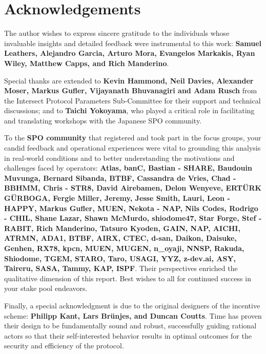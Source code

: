 \documentclass[11pt, letterpaper]{article}
\begin{document}
\tableofcontents
\newpage
\pagestyle{fancy} 

\newpage

\section*{Acknowledgements}

The author wishes to express sincere gratitude to the individuals whose 
invaluable insights and detailed feedback were instrumental to this work: 
\textbf{Samuel Leathers, Alejandro Garcia, Arturo Mora, Evangelos Markakis, Ryan Wiley, 
Matthew Capps, and Rich Manderino}.

Special thanks are extended to \textbf{Kevin Hammond, Neil Davies, Alexander Moser, Markus Gufler, 
Vijayanath Bhuvanagiri and Adam Rusch} from the Intersect Protocol Parameters Sub-Committee for 
their support and technical discussions; and to \textbf{Taichi Yokoyama}, who played a critical role in
facilitating and translating workshops with the Japanese SPO community.

To the \textbf{SPO community} that registered and took part in the focus groups, your candid 
feedback and operational experiences were vital to grounding this analysis in real-world conditions
and to better understanding the motivations and challenges faced by operators: \textbf{Atlas, banC, Bastian - SHARE, 
Baudouin Muvunga, Bernard Sibanda, BTBF, Cassandra de Vries, Chad - BBHMM, Chris - STR8, 
David Airebamen, Delon Wenyeve, ERT\"URK G\"URBOGA, Fergie Miller, Jeremy, Jesse Smith, Lauri, Leon - HAPPY, 
Markus Gufler, MUEN, Nekota - NAP, Nils Codes, Rodrigo - CHIL, Shane Lazar, Shawn McMurdo, 
shiodome47, Star Forge, Stef - RABIT, Rich Manderino, Tatsuro Kyoden, GAIN, NAP, AICHI, ATRMN, ADA1, BTBF, AIRX,
CTEC, d-san, Daikon, Daisuke, Genhen, RX78, kpcn, MUEN, MUGEN, n\_oyaji, NNSP, Rakuda, Shiodome, TGEM, STARO, Taro,
USAGI, YYZ, z-dev.ai, ASY, Taireru, SASA, Tammy, KAP, ISPF}. Their perspectives enriched the qualitative dimension of this
report. Best wishes to all for continued success in your stake pool endeavors.

Finally, a special acknowledgment is due to the original designers of the incentive scheme: 
\textbf{Philipp Kant, Lars Brünjes, and Duncan Coutts}. Time has proven their design to be fundamentally 
sound and robust, successfully guiding rational actors so that their self-interested behavior results in 
optimal outcomes for the security and efficiency of the protocol.

\newpage
\end{document}
